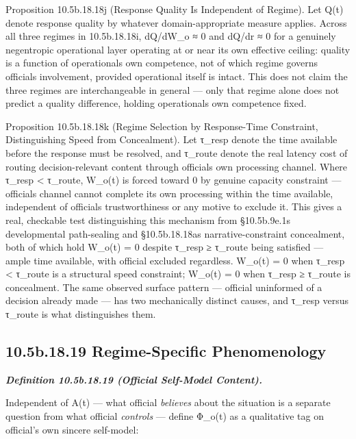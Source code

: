 \documentclass[
]{article}
\begin{document}
Proposition 10.5b.18.18j (Response Quality Is Independent of Regime).
Let Q(t) denote response quality by whatever domain-appropriate measure
applies. Across all three regimes in 10.5b.18.18i, dQ/dW\_o ≈ 0 and
dQ/dr ≈ 0 for a genuinely negentropic operational layer operating at or
near its own effective ceiling: quality is a function of operationals
own competence, not of which regime governs officials involvement,
provided operational itself is intact. This does not claim the three
regimes are interchangeable in general --- only that regime alone does
not predict a quality difference, holding operationals own competence
fixed.

Proposition 10.5b.18.18k (Regime Selection by Response-Time Constraint,
Distinguishing Speed from Concealment). Let τ\_resp denote the time
available before the response must be resolved, and τ\_route denote the
real latency cost of routing decision-relevant content through officials
own processing channel. Where τ\_resp \textless{} τ\_route, W\_o(t) is
forced toward 0 by genuine capacity constraint --- officials channel
cannot complete its own processing within the time available,
independent of officials trustworthiness or any motive to exclude it.
This gives a real, checkable test distinguishing this mechanism from
§10.5b.9e.1s developmental path-sealing and §10.5b.18.18as
narrative-constraint concealment, both of which hold W\_o(t) = 0 despite
τ\_resp ≥ τ\_route being satisfied --- ample time available, with
official excluded regardless. W\_o(t) = 0 when τ\_resp \textless{}
τ\_route is a structural speed constraint; W\_o(t) = 0 when τ\_resp ≥
τ\_route is concealment. The same observed surface pattern --- official
uninformed of a decision already made --- has two mechanically distinct
causes, and τ\_resp versus τ\_route is what distinguishes them.

\hypertarget{b.18.19-regime-specific-phenomenology}{%
\subsection{10.5b.18.19 Regime-Specific
Phenomenology}\label{b.18.19-regime-specific-phenomenology}}

\emph{\textbf{Definition 10.5b.18.19 (Official Self-Model Content).}}

Independent of A(t) --- what official \emph{believes} about the
situation is a separate question from what official \emph{controls} ---
define Φ\_o(t) as a qualitative tag on official's own sincere
self-model:
\end{document}
